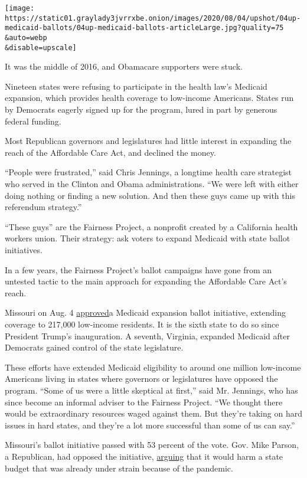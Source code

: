 \texttt{[image: https://static01.graylady3jvrrxbe.onion/images/2020/08/04/upshot/04up-medicaid-ballots/04up-medicaid-ballots-articleLarge.jpg?quality=75\\\&auto=webp\\\&disable=upscale]}

It was the middle of 2016, and Obamacare supporters were stuck.

Nineteen states were refusing to participate in the health law's
Medicaid expansion, which provides health coverage to low-income
Americans. States run by Democrats eagerly signed up for the program,
lured in part by generous federal funding.

Most Republican governors and legislatures had little interest in
expanding the reach of the Affordable Care Act, and declined the money.

``People were frustrated,'' said Chris Jennings, a longtime health care
strategist who served in the Clinton and Obama administrations. ``We
were left with either doing nothing or finding a new solution. And then
these guys came up with this referendum strategy.''

``These guys'' are the Fairness Project, a nonprofit created by a
California health workers union. Their strategy: ask voters to expand
Medicaid with state ballot initiatives.

In a few years, the Fairness Project's ballot campaigns have gone from
an untested tactic to the main approach for expanding the Affordable
Care Act's reach.

Missouri on Aug. 4
\href{https://www.nytimes3xbfgragh.onion/interactive/2020/08/04/us/elections/results-missouri-medicaid-expansion-amendment.html}{approved}a
Medicaid expansion ballot initiative, extending coverage to 217,000
low-income residents. It is the sixth state to do so since President
Trump's inauguration. A seventh, Virginia, expanded Medicaid after
Democrats gained control of the state legislature.

These efforts have extended Medicaid eligibility to around one million
low-income Americans living in states where governors or legislatures
have opposed the program. ``Some of us were a little skeptical at
first,'' said Mr. Jennings, who has since become an informal adviser to
the Fairness Project. ``We thought there would be extraordinary
resources waged against them. But they're taking on hard issues in hard
states, and they're a lot more successful than some of us can say.''

Missouri's ballot initiative passed with 53 percent of the vote. Gov.
Mike Parson, a Republican, had opposed the initiative,
\href{https://www.kshb.com/news/local-news/missouri-medicaid-expansion-set-for-august-election}{arguing}
that it would harm a state budget that was already under strain because
of the pandemic.

